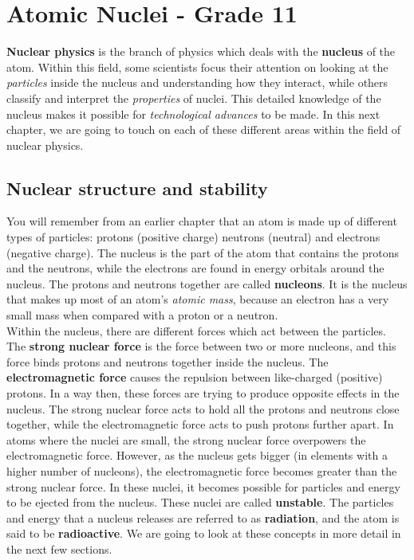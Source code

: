 



\chapter{Atomic Nuclei - Grade 11}
\label{chap:an}

\textbf{Nuclear physics} is the branch of physics which deals with the \textbf{nucleus} of the atom. Within this field, some scientists focus their attention on looking at the \textit{particles} inside the nucleus and understanding how they interact, while others classify and interpret the \textit{properties} of nuclei. This detailed knowledge of the nucleus makes it possible for \textit{technological advances} to be made. In this next chapter, we are going to touch on each of these different areas within the field of nuclear physics.



\section{Nuclear structure and stability}
\label{sec:an:ns}

You will remember from an earlier chapter that an atom is made up of different types of particles: protons (positive charge) neutrons (neutral) and electrons (negative charge). The nucleus is the part of the atom that contains the protons and the neutrons, while the electrons are found in energy orbitals around the nucleus. The protons and neutrons together are called \textbf{nucleons}. It is the nucleus that makes up most of an atom's \textit{atomic mass}, because an electron has a very small mass when compared with a proton or a neutron.\\

Within the nucleus, there are different forces which act between the particles. The \textbf{strong nuclear force} is the force between two or more nucleons, and this force binds protons and neutrons together inside the nucleus. The \textbf{electromagnetic force} causes the repulsion between like-charged (positive) protons. In a way then, these forces are trying to produce opposite effects in the nucleus. The strong nuclear force acts to hold all the protons and neutrons close together, while the electromagnetic force acts to push protons further apart. In atoms where the nuclei are small, the strong nuclear force overpowers the electromagnetic force. However, as the nucleus gets bigger (in elements with a higher number of nucleons), the electromagnetic force becomes greater than the strong nuclear force. In these nuclei, it becomes possible for particles and energy to be ejected from the nucleus. These nuclei are called \textbf{unstable}. The particles and energy that a nucleus releases are referred to as \textbf{radiation}, and the atom is said to be \textbf{radioactive}. We are going to look at these concepts in more detail in the next few sections.



